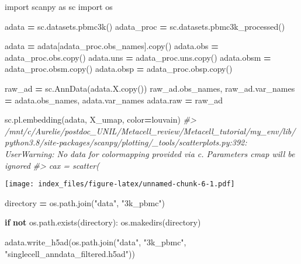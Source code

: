 \documentclass[
]{book}
\newenvironment{Shaded}{\begin{snugshade}}{\end{snugshade}}
\newcommand{\CommentTok}[1]{\textcolor[rgb]{0.56,0.35,0.01}{\textit{#1}}}
\newcommand{\ControlFlowTok}[1]{\textcolor[rgb]{0.13,0.29,0.53}{\textbf{#1}}}
\newcommand{\ImportTok}[1]{#1}
\newcommand{\KeywordTok}[1]{\textcolor[rgb]{0.13,0.29,0.53}{\textbf{#1}}}
\newcommand{\NormalTok}[1]{#1}
\newcommand{\OperatorTok}[1]{\textcolor[rgb]{0.81,0.36,0.00}{\textbf{#1}}}
\newcommand{\StringTok}[1]{\textcolor[rgb]{0.31,0.60,0.02}{#1}}
\begin{document}
\begin{Shaded}
\begin{Highlighting}[]
\ImportTok{import}\NormalTok{ scanpy }\ImportTok{as}\NormalTok{ sc }
\ImportTok{import}\NormalTok{ os}

\NormalTok{adata }\OperatorTok{=}\NormalTok{ sc.datasets.pbmc3k()}
\NormalTok{adata\_proc }\OperatorTok{=}\NormalTok{ sc.datasets.pbmc3k\_processed()}

\NormalTok{adata       }\OperatorTok{=}\NormalTok{ adata[adata\_proc.obs\_names].copy()}
\NormalTok{adata.obs   }\OperatorTok{=}\NormalTok{ adata\_proc.obs.copy()}
\NormalTok{adata.uns   }\OperatorTok{=}\NormalTok{ adata\_proc.uns.copy()}
\NormalTok{adata.obsm  }\OperatorTok{=}\NormalTok{ adata\_proc.obsm.copy()}
\NormalTok{adata.obsp  }\OperatorTok{=}\NormalTok{ adata\_proc.obsp.copy()}

\NormalTok{raw\_ad }\OperatorTok{=}\NormalTok{ sc.AnnData(adata.X.copy())}
\NormalTok{raw\_ad.obs\_names, raw\_ad.var\_names }\OperatorTok{=}\NormalTok{ adata.obs\_names, adata.var\_names}
\NormalTok{adata.raw }\OperatorTok{=}\NormalTok{ raw\_ad}

\NormalTok{sc.pl.embedding(adata, }\StringTok{\textquotesingle{}X\_umap\textquotesingle{}}\NormalTok{, color}\OperatorTok{=}\StringTok{\textquotesingle{}louvain\textquotesingle{}}\NormalTok{)}
\CommentTok{\#\textgreater{} /mnt/c/Aurelie/postdoc\_UNIL/Metacell\_review/Metacell\_tutorial/my\_env/lib/python3.8/site{-}packages/scanpy/plotting/\_tools/scatterplots.py:392: UserWarning: No data for colormapping provided via \textquotesingle{}c\textquotesingle{}. Parameters \textquotesingle{}cmap\textquotesingle{} will be ignored}
\CommentTok{\#\textgreater{}   cax = scatter(}
\end{Highlighting}
\end{Shaded}

\texttt{[image: index\_files/figure-latex/unnamed-chunk-6-1.pdf]}

\begin{Shaded}
\begin{Highlighting}[]
\NormalTok{directory }\OperatorTok{=}\NormalTok{ os.path.join(}\StringTok{"data"}\NormalTok{, }\StringTok{"3k\_pbmc"}\NormalTok{)}

\ControlFlowTok{if} \KeywordTok{not}\NormalTok{ os.path.exists(directory):}
\NormalTok{    os.makedirs(directory)}
    
\NormalTok{adata.write\_h5ad(os.path.join(}\StringTok{"data"}\NormalTok{, }\StringTok{"3k\_pbmc"}\NormalTok{, }\StringTok{"singlecell\_anndata\_filtered.h5ad"}\NormalTok{))}
\end{Highlighting}
\end{Shaded}
\end{document}
